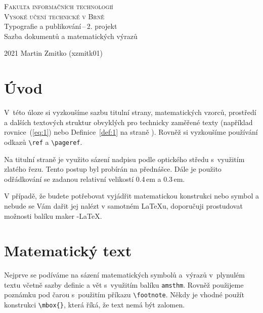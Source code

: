 \documentclass[twocolumn, 11pt]{article}
\theoremstyle{definition}
\begin{document}
\begin{titlepage}
\begin{center}
{\Huge \textsc{Fakulta informačních technologií\\
\bigskip
Vysoké učení technické v Brně}} \\
{\LARGE Typografie a publikování\,--\,2. projekt\\
\medskip
Sazba dokumentů a matematických výrazů} \\
\end{center}
{\Large 2021 \hfill Martin Zmitko (xzmitk01)}
\end{titlepage}

\section*{Úvod}

V~této úloze si vyzkoušíme sazbu titulní strany, matematických vzorců, prostředí a dalších textových struktur obvyklých pro technicky zaměřené texty (například rovnice~(\ref{eq:1}) nebo Definice~\ref{def:1} na straně \pageref{def:1}). 
Rovněž si vyzkoušíme používání odkazů \verb|\ref| a \verb|\pageref|.

Na titulní straně je využito sázení nadpisu podle optického středu s~využitím zlatého řezu.
Tento postup byl probírán na přednášce. 
Dále je použito odřádkování se zadanou relativní velikostí 0.4\,em a 0.3\,em.

V případě, že budete potřebovat vyjádřit matematickou konstrukci nebo symbol a nebude se Vám dařit jej nalézt v samotném \LaTeX u, doporučuji prostudovat možnosti balíku maker \AmS-\LaTeX.

\section{Matematický text}

Nejprve se podíváme na sázení matematických symbolů a~výrazů v~plynulém textu včetně sazby definic a vět s~využitím balíku \verb|amsthm|.
Rovněž použijeme poznámku pod čarou s~použitím příkazu \verb|\footnote|.
Někdy je vhodné použít konstrukci \verb|\mbox{}|, která říká, že text nemá být zalomen.
\end{document}
